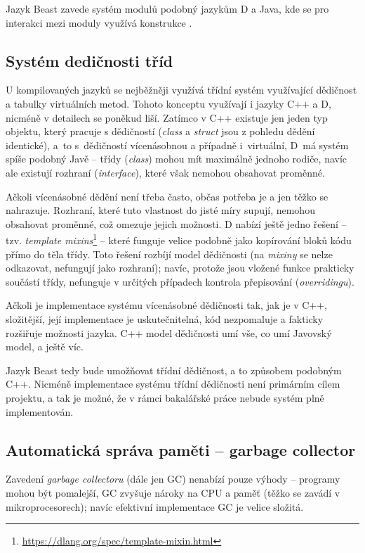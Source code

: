 Jazyk Beast zavede systém modulů podobný jazykům D a Java, kde se pro interakci mezi moduly využívá konstrukce .

\subsection{Systém dedičnosti tříd} U kompilovaných jazyků se nejběžněji využívá třídní systém využívající dědičnost a tabulky virtuálních metod. Tohoto konceptu využívají i jazyky C++ a D, nicméně v detailech se poněkud liší. Zatímco v C++ existuje jen jeden typ objektu, který pracuje s dědičností (\textit{class} a \textit{struct} jsou z pohledu dědění identické), a~to s~dědičností vícenásobnou a případně i~virtuální, D~má systém spíše podobný Javě -- třídy (\textit{class}) mohou mít maximálně jednoho rodiče, navíc ale existují rozhraní (\textit{interface}), které však nemohou obsahovat proměnné.

Ačkoli vícenásobné dědění není třeba často, občas potřeba je a jen těžko se nahrazuje. Rozhraní, které tuto vlastnost do jisté míry supují, nemohou obsahovat proměnné, což omezuje jejich možnosti. D nabízí ještě jedno řešení -- tzv. \textit{template mixins}\footnote{\url{https://dlang.org/spec/template-mixin.html}} -- které funguje velice podobně jako kopírování bloků kódu přímo do těla třídy. Toto řešení rozbíjí model dědičnosti (na \textit{mixiny} se nelze odkazovat, nefungují jako rozhraní); navíc, protože jsou vložené funkce prakticky součástí třídy, nefunguje v určitých případech kontrola přepisování (\textit{overridingu}).

Ačkoli je implementace systému vícenásobné dědičnosti tak, jak je v C++, složitější, její implementace je uskutečnitelná, kód nezpomaluje a fakticky rozšiřuje možnosti jazyka. C++ model dědičnosti umí vše, co umí Javovský model, a ještě víc.

Jazyk Beast tedy bude umožňovat třídní dědičnost, a to způsobem podobným C++. Nicméně implementace systému třídní dědičnosti není primárním cílem projektu, a tak je možné, že v rámci bakalářské práce nebude systém plně implementován.

\subsection{Automatická správa paměti -- garbage collector}
Zavedení \textit{garbage collectoru} (dále jen GC) nenabízí pouze výhody -- programy mohou být pomalejší, GC zvyšuje nároky na CPU a paměť (těžko se zavádí v mikroprocesorech); navíc efektivní implementace GC je velice složitá.


